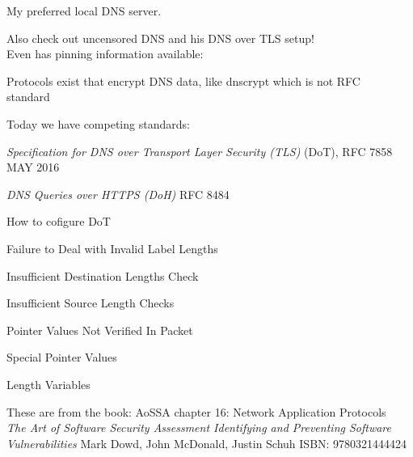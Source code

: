 \documentclass[Screen16to9,17pt]{foils}
\begin{document}

My preferred local DNS server.

Also check out uncensored DNS and his DNS over TLS setup!\\
Even has pinning information available:\\ {\small{}}







\begin{list1}
\item Protocols exist that encrypt DNS data, like dnscrypt which is not RFC\\ standard  
\item Today we have competing standards:
\item
\emph{Specification for DNS over Transport Layer Security (TLS)} (DoT), RFC 7858 MAY 2016\\

\item \emph{DNS Queries over HTTPS (DoH)} RFC 8484

\item How to cofigure DoT 
\end{list1}



\begin{list2}
\item Failure to Deal with Invalid Label Lengths
\item Insufficient Destination Lengths Check
\item Insufficient Source Length Checks
\item Pointer Values Not Verified In Packet
\item Special Pointer Values
\item Length Variables
\item These are from the book: AoSSA chapter 16: Network Application Protocols\\
\emph{The Art of Software Security Assessment Identifying and Preventing
Software Vulnerabilities}
Mark Dowd, John McDonald, Justin Schuh ISBN: 9780321444424
\end{list2}
\end{document}
